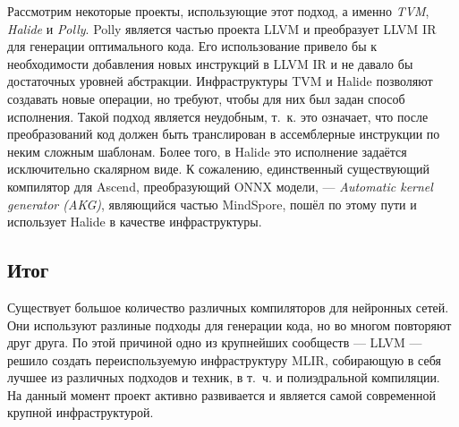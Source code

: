 Рассмотрим некоторые проекты, использующие этот подход, а именно \textit{TVM},
\textit{Halide} и \textit{Polly}. Polly является частью проекта LLVM и
преобразует LLVM IR для генерации оптимального кода. Его использование привело
бы к необходимости добавления новых инструкций в LLVM IR и не давало бы
достаточных уровней абстракции. Инфраструктуры TVM и Halide позволяют
создавать новые операции, но требуют, чтобы для них был задан способ исполнения.
Такой подход является неудобным, т.~к. это означает, что после преобразований
код должен быть транслирован в ассемблерные инструкции по неким сложным
шаблонам. Более того, в Halide это исполнение задаётся исключительно скалярном
виде. К сожалению, единственный существующий компилятор для Ascend,
преобразующий ONNX модели, --- \textit{Automatic kernel generator (AKG)},
являющийся частью MindSpore, пошёл по этому пути и использует Halide в качестве
инфраструктуры.

\subsection{Итог}

Существует большое количество различных компиляторов для нейронных сетей. Они
используют разлиные подходы для генерации кода, но во многом повторяют друг
друга. По этой причиной одно из крупнейших сообществ --- LLVM --- решило
создать переиспользуемую инфраструктуру MLIR, собирающую в себя лучшее из
различных подходов и техник, в т.~ч. и полиэдральной компиляции. На данный
момент проект активно развивается и является самой современной крупной
инфраструктурой.

\newpage
